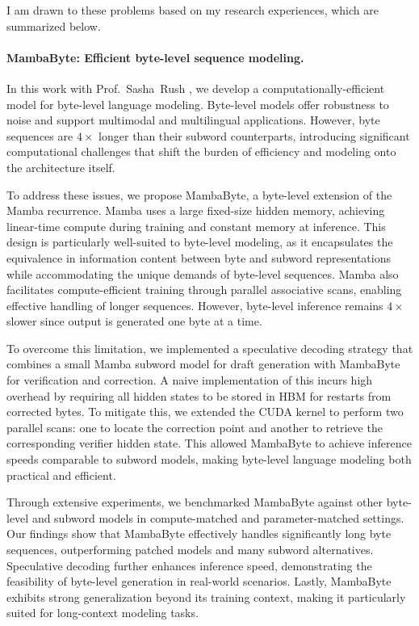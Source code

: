 
I am drawn to these problems based on my research experiences, which are summarized below.

\paragraph{MambaByte: Efficient byte-level sequence modeling.}
%
In this work with Prof.~Sasha~Rush \citep{wang_mambabyte_2024}, we develop a computationally-efficient model for byte-level language modeling.
% 
Byte-level models offer robustness to noise and support multimodal and multilingual applications.
% 
However, byte sequences are $4\times$ longer than their subword counterparts, introducing significant computational challenges that shift the burden of efficiency and modeling onto the architecture itself.

To address these issues, we propose MambaByte, a byte-level extension of the Mamba recurrence.
% 
Mamba uses a large fixed-size hidden memory, achieving linear-time compute during training and constant memory at inference.
% 
This design is particularly well-suited to byte-level modeling, as it encapsulates the equivalence in information content between byte and subword representations while accommodating the unique demands of byte-level sequences.
% 
Mamba also facilitates compute-efficient training through parallel associative scans, enabling effective handling of longer sequences.
%
However, byte-level inference remains $4\times$ slower since output is generated one byte at a time.

To overcome this limitation, we implemented a speculative decoding strategy that combines a small Mamba subword model for draft generation with MambaByte for verification and correction.
% 
A naive implementation of this incurs high overhead by requiring all hidden states to be stored in HBM for restarts from corrected bytes.
%
To mitigate this, we extended the CUDA kernel to perform two parallel scans: one to locate the correction point and another to retrieve the corresponding verifier hidden state.
%
This allowed MambaByte to achieve inference speeds comparable to subword models, making byte-level language modeling both practical and efficient.

Through extensive experiments, we benchmarked MambaByte against other byte-level and subword models in compute-matched and parameter-matched settings.
% 
Our findings show that MambaByte effectively handles significantly long byte sequences, outperforming patched models and many subword alternatives. 
% 
Speculative decoding further enhances inference speed, demonstrating the feasibility of byte-level generation in real-world scenarios.
% 
Lastly, MambaByte exhibits strong generalization beyond its training context, making it particularly suited for long-context modeling tasks.

